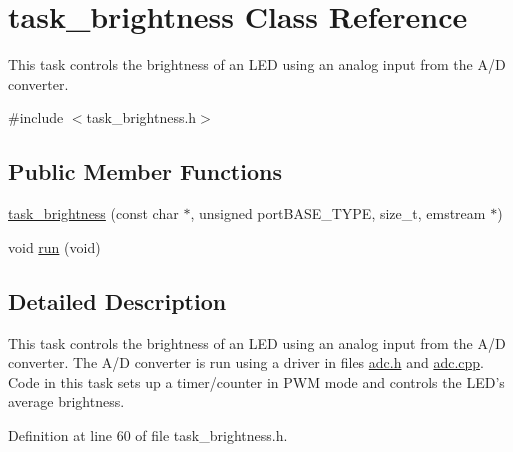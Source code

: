 \hypertarget{classtask__brightness}{
\section{task\_\-brightness Class Reference}
\label{classtask__brightness}
}


This task controls the brightness of an LED using an analog input from the A/D converter.  


{\ttfamily \#include $<$task\_\-brightness.h$>$}\subsection*{Public Member Functions}
\begin{DoxyCompactItemize}
\item 
\hyperlink{classtask__brightness_a5802baf3a0c9fe53ccbce8966d1fad47}{task\_\-brightness} (const char $\ast$, unsigned portBASE\_\-TYPE, size\_\-t, emstream $\ast$)
\item 
void \hyperlink{classtask__brightness_a615beac07a99f0856f048a46fd9a3898}{run} (void)
\end{DoxyCompactItemize}


\subsection{Detailed Description}
This task controls the brightness of an LED using an analog input from the A/D converter. The A/D converter is run using a driver in files {\ttfamily \hyperlink{adc_8h}{adc.h}} and {\ttfamily \hyperlink{adc_8cpp}{adc.cpp}}. Code in this task sets up a timer/counter in PWM mode and controls the LED's average brightness. 

Definition at line 60 of file task\_\-brightness.h.

